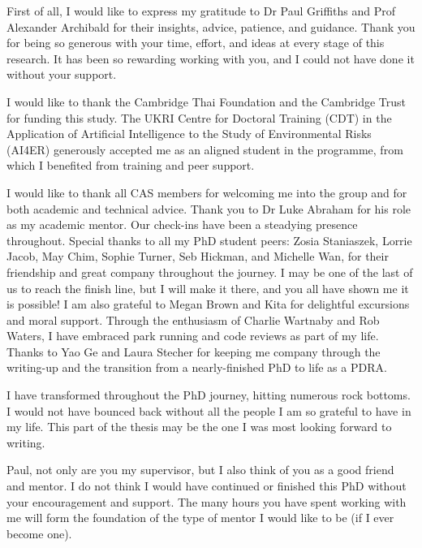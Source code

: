 
\begin{acknowledgements}      

First of all, I would like to express my gratitude to Dr Paul Griffiths and Prof Alexander Archibald for their insights, advice, patience, and guidance. Thank you for being so generous with your time, effort, and ideas at every stage of this research. It has been so rewarding working with you, and I could not have done it without your support.

I would like to thank the Cambridge Thai Foundation and the Cambridge Trust for funding this study. The UKRI Centre for Doctoral Training (CDT) in the Application of Artificial Intelligence to the Study of Environmental Risks (AI4ER) generously accepted me as an aligned student in the programme, from which I benefited from training and peer support.

I would like to thank all CAS members for welcoming me into the group and for both academic and technical advice. Thank you to Dr Luke Abraham for his role as my academic mentor. Our check-ins have been a steadying presence throughout. Special thanks to all my PhD student peers: Zosia Staniaszek, Lorrie Jacob, May Chim, Sophie Turner, Seb Hickman, and Michelle Wan, for their friendship and great company throughout the journey. I may be one of the last of us to reach the finish line, but I will make it there, and you all have shown me it is possible! I am also grateful to Megan Brown and Kita for delightful excursions and moral support. Through the enthusiasm of Charlie Wartnaby and Rob Waters, I have embraced park running and code reviews as part of my life. Thanks to Yao Ge and Laura Stecher for keeping me company through the writing-up and the transition from a nearly-finished PhD to life as a PDRA.

I have transformed throughout the PhD journey, hitting numerous rock bottoms. I would not have bounced back without all the people I am so grateful to have in my life. This part of the thesis may be the one I was most looking forward to writing.

Paul, not only are you my supervisor, but I also think of you as a good friend and mentor. I do not think I would have continued or finished this PhD without your encouragement and support. The many hours you have spent working with me will form the foundation of the type of mentor I would like to be (if I ever become one).


\end{acknowledgements}
